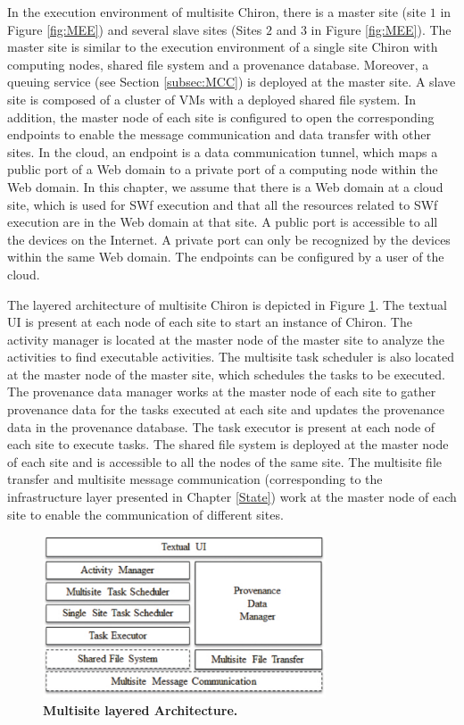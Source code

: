 In the execution environment of multisite Chiron, there is a master site (site $1$ in Figure \ref{fig:MEE}) and several slave sites (Sites $2$ and $3$ in Figure \ref{fig:MEE}). The master site is similar to the execution environment of a single site Chiron with computing nodes, shared file system and a provenance database. Moreover, a queuing service (see Section \ref{subsec:MCC}) is deployed at the master site. A slave site is composed of a cluster of VMs with a deployed shared file system. In addition, the master node of each site is configured to open the corresponding endpoints to enable the message communication and data transfer with other sites.
In the cloud, an endpoint is a data communication tunnel, which maps a public port of a Web domain to a private port of a computing node within the Web domain. In this chapter, we assume that there is a Web domain at a cloud site, which is used for SWf execution and that all the resources related to SWf execution are in the Web domain at that site. A public port is accessible to all the devices on the Internet. A private port can only be recognized by the devices within the same Web domain. The endpoints can be configured by a user of the cloud.

The layered architecture of multisite Chiron is depicted in Figure \ref{fig:MCA}. The textual UI is present at each node of each site to start an instance of Chiron. The activity manager is located at the master node of the master site to analyze the activities to find executable activities. The multisite task scheduler is also located at the master node of the master site, which schedules the tasks to be executed. The provenance data manager works at the master node of each site to gather provenance data for the tasks executed at each site and updates the provenance data in the provenance database. The task executor is present at each node of each site to execute tasks. The shared file system is deployed at the master node of each site and is accessible to all the nodes of the same site. The multisite file transfer and multisite message communication (corresponding to the infrastructure layer presented in Chapter \ref{State}) work at the master node of each site to enable the communication of different sites.

\begin{figure}
\begin{centering}
\captionsetup{justification=centering}
\includegraphics[width=84mm]{figures/MCA}
\par\end{centering}
\caption{\textbf{Multisite layered Architecture. }}
\label{fig:MCA}
\end{figure} 

